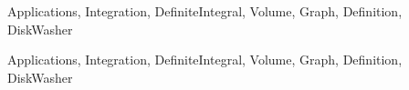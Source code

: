 \begin{tagblock}{Applications, Integration, DefiniteIntegral, Volume, Graph, Definition, DiskWasher}
\begin{question}
    
\begin{tags}
       Applications, Integration, DefiniteIntegral, Volume, Graph, Definition, DiskWasher
\end{tags}
    
\begin{diary}
\end{diary}
	
\begin{solution}

\end{solution}
	
\end{question}

\end{tagblock}

